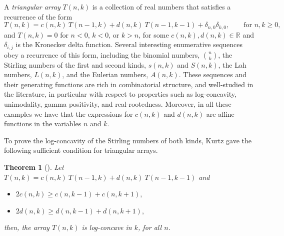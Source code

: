 \documentclass{article}
\newtheorem{theorem}{Theorem}[section]
\theoremstyle{definition}
\numberwithin{equation}{section}
\begin{document}
A \emph{triangular array} $T(n,k)$ is a collection of real numbers that satisfies a recurrence of the form 
\begin{equation}\label{Eq:triangular}
    T(n,k) = c(n,k)\ T(n-1,k) + d(n,k)\ T(n-1,k-1) + \delta_{n,0}\delta_{k,0}, \qquad \text{for }n, k \geq 0,
\end{equation}
and $T(n,k) = 0$ for $n < 0$, $k < 0$, or $k > n$, for some $c(n,k), d(n,k) \in \mathbb{R}$ and $\delta_{i,j}$ is the Kronecker delta function.
Several interesting enumerative sequences obey a recurrence of this form, including the binomial numbers, $\binom{n}{k}$, the Stirling numbers of the first and second kinds, $s(n,k)$ and $S(n,k)$, the Lah numbers, $L(n,k)$, and the Eulerian numbers, $A(n,k)$.
These sequences and their generating functions are rich in combinatorial structure, and well-studied in the literature, in particular with respect to properties such as log-concavity, unimodality, gamma positivity, and real-rootedness.
Moreover, in all these examples we have that the expressions for $c(n,k)$ and $d(n,k)$ are affine functions in the variables $n$ and $k$.


To prove the log-concavity of the Stirling numbers of both kinds, Kurtz \cite{kurtz-log-concavity} gave the following sufficient condition for triangular arrays.

\begin{theorem}[{\cite[Theorem 2]{kurtz-log-concavity}}]
    Let $T(n,k)=c(n,k)\ T(n-1,k) + d(n,k)\ T(n-1,k-1)$ and 
    \begin{itemize}
        \item $2c(n,k)\ge c(n,k-1)+c(n,k+1),$
        \item $2d(n,k)\ge d(n,k-1)+d(n,k+1),$
    \end{itemize}
     then, the array $T(n,k)$ is log-concave in $k$, for all $n$.
\end{theorem}
\end{document}
